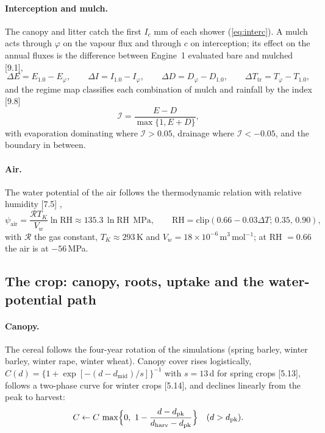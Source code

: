 \paragraph{Interception and mulch.} The canopy and litter catch the first $I_c$ mm of each shower (\cref{eq:interc}). A mulch acts through $\varphi$ on the vapour flux and through $c$ on interception; its effect on the annual fluxes is the difference between Engine~1 evaluated bare and mulched [9.1],
\begin{equation}
\Delta E=E_{1.0}-E_\varphi,\qquad \Delta I=I_{1.0}-I_\varphi,\qquad \Delta D=D_\varphi-D_{1.0},\qquad \Delta T_{\mathrm{tr}}=T_\varphi-T_{1.0},
\label{eq:mulchdelta}
\end{equation}
and the regime map classifies each combination of mulch and rainfall by the index [9.8]
\begin{equation}
\mathcal I=\frac{E-D}{\max\{1,E+D\}},
\label{eq:regime}
\end{equation}
with evaporation dominating where $\mathcal I>0.05$, drainage where $\mathcal I<-0.05$, and the boundary in between.

\paragraph{Air.} The water potential of the air follows the thermodynamic relation with relative humidity [7.5] \citep{Nobel2009},
\begin{equation}
\psi_{\mathrm{air}}=\frac{\mathcal RT_K}{V_w}\ln\mathrm{RH}\approx135.3\,\ln\mathrm{RH}\ \ \mathrm{MPa},\qquad \mathrm{RH}=\mathrm{clip}(0.66-0.03\Delta T;\,0.35,\,0.90),
\label{eq:psiair}
\end{equation}
with $\mathcal R$ the gas constant, $T_K\approx293$\,K and $V_w=18\times10^{-6}$\,m$^3$\,mol$^{-1}$; at RH $=0.66$ the air is at $-56$\,MPa.

\subsection{The crop: canopy, roots, uptake and the water-potential path}
\label{sec:sys-plant}
\paragraph{Canopy.} The cereal follows the four-year rotation of the simulations (spring barley, winter barley, winter rape, winter wheat). Canopy cover rises logistically, $C(d)=\{1+\exp[-(d-d_{\mathrm{mid}})/s]\}^{-1}$ with $s=13$\,d for spring crops [5.13], follows a two-phase curve for winter crops [5.14], and declines linearly from the peak to harvest:
\begin{equation}
C\leftarrow C\,\max\Bigl\{0,\ 1-\frac{d-d_{\mathrm{pk}}}{d_{\mathrm{harv}}-d_{\mathrm{pk}}}\Bigr\}\quad(d>d_{\mathrm{pk}}).
\label{eq:cover}
\end{equation}
